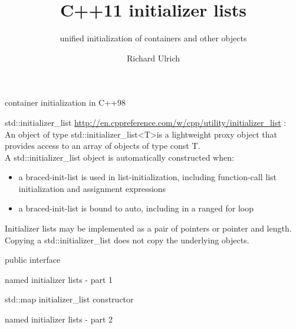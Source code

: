 \documentclass[11pt]{beamer}
\author{Richard Ulrich}
\title{C++11 initializer lists}
\subtitle{unified initialization of containers and other objects}
\institute{cubx Software AG}
\begin{document}
\begin{frame}
\titlepage
\end{frame}


\begin{frame}{container initialization in C++98}

\end{frame}

\begin{frame}{std::initializer\_list}
\href{http://en.cppreference.com/w/cpp/utility/initializer\_list}{http://en.cppreference.com/w/cpp/utility/initializer\_list} :
\\[0.2cm]
An object of type std::initializer\_list\textless T\textgreater is a lightweight proxy object that provides access to an array of objects of type const T.
\pause
\\[0.2cm]
A std::initializer\_list object is automatically constructed when:
\begin{itemize}
\item a braced-init-list is used in list-initialization, including function-call list initialization and assignment expressions
\item a braced-init-list is bound to auto, including in a ranged for loop 
\end{itemize}
\pause
Initializer lists may be implemented as a pair of pointers or pointer and length. Copying a std::initializer\_list does not copy the underlying objects. 
\end{frame}

\begin{frame}{public interface}

\end{frame}

\begin{frame}{named initializer lists - part 1}

\end{frame}

\begin{frame}{std::map initializer\_list constructor}

\end{frame}

\begin{frame}{named initializer lists - part 2}

\end{frame}
\end{document}
